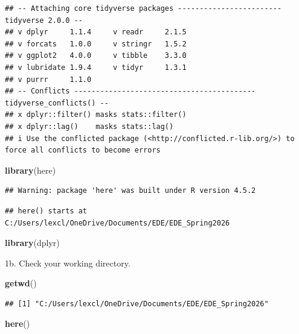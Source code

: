 \documentclass[
]{article}
\newenvironment{Shaded}{\begin{snugshade}}{\end{snugshade}}
\newcommand{\FunctionTok}[1]{\textcolor[rgb]{0.13,0.29,0.53}{\textbf{#1}}}
\newcommand{\NormalTok}[1]{#1}
\begin{document}
\begin{verbatim}
## -- Attaching core tidyverse packages ------------------------ tidyverse 2.0.0 --
## v dplyr     1.1.4     v readr     2.1.5
## v forcats   1.0.0     v stringr   1.5.2
## v ggplot2   4.0.0     v tibble    3.3.0
## v lubridate 1.9.4     v tidyr     1.3.1
## v purrr     1.1.0     
## -- Conflicts ------------------------------------------ tidyverse_conflicts() --
## x dplyr::filter() masks stats::filter()
## x dplyr::lag()    masks stats::lag()
## i Use the conflicted package (<http://conflicted.r-lib.org/>) to force all conflicts to become errors
\end{verbatim}

\begin{Shaded}
\begin{Highlighting}[]
\FunctionTok{library}\NormalTok{(here)}
\end{Highlighting}
\end{Shaded}

\begin{verbatim}
## Warning: package 'here' was built under R version 4.5.2
\end{verbatim}

\begin{verbatim}
## here() starts at C:/Users/lexcl/OneDrive/Documents/EDE/EDE_Spring2026
\end{verbatim}

\begin{Shaded}
\begin{Highlighting}[]
\FunctionTok{library}\NormalTok{(dplyr)}
\end{Highlighting}
\end{Shaded}

1b. Check your working directory.

\begin{Shaded}
\begin{Highlighting}[]
\FunctionTok{getwd}\NormalTok{()}
\end{Highlighting}
\end{Shaded}

\begin{verbatim}
## [1] "C:/Users/lexcl/OneDrive/Documents/EDE/EDE_Spring2026"
\end{verbatim}

\begin{Shaded}
\begin{Highlighting}[]
\FunctionTok{here}\NormalTok{()}
\end{Highlighting}
\end{Shaded}
\end{document}
